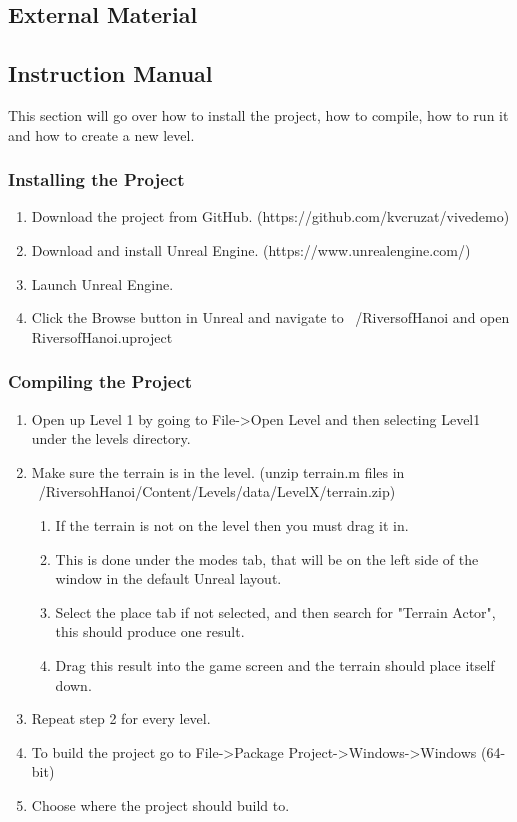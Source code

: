 \begin{appendices}
\chapter{External Material}

\section{Instruction Manual}

	This section will go over how to install the project, how to compile, how to run it and how to create a new level.

\subsection{Installing the Project}

\begin{enumerate}
	\item Download the project from GitHub. (https://github.com/kvcruzat/vivedemo)
	\item Download and install Unreal Engine. (https://www.unrealengine.com/)
	\item Launch Unreal Engine.
	\item Click the Browse button in Unreal and navigate to ~/RiversofHanoi and open RiversofHanoi.uproject
\end{enumerate}

\subsection{Compiling the Project}

\begin{enumerate}
	\item Open up Level 1 by going to File->Open Level   and then selecting Level1 under the levels directory.
	\item Make sure the terrain is in the level. (unzip terrain.m files in ~/RiversohHanoi/Content/Levels/data/LevelX/terrain.zip)
	\begin{enumerate}
	    \item If the terrain is not on the level then you must drag it in.
		\item This is done under the modes tab, that will be on the left side of the window in the default Unreal layout.
		\item Select the place tab if not selected, and then search for "Terrain Actor", this should produce one result.
		\item Drag this result into the game screen and the terrain should place itself down.
	\end{enumerate}
	\item Repeat step 2 for every level.
	\item To build the project go to File->Package Project->Windows->Windows (64-bit)
	\item Choose where the project should build to.
\end{enumerate}


\end{appendices}
